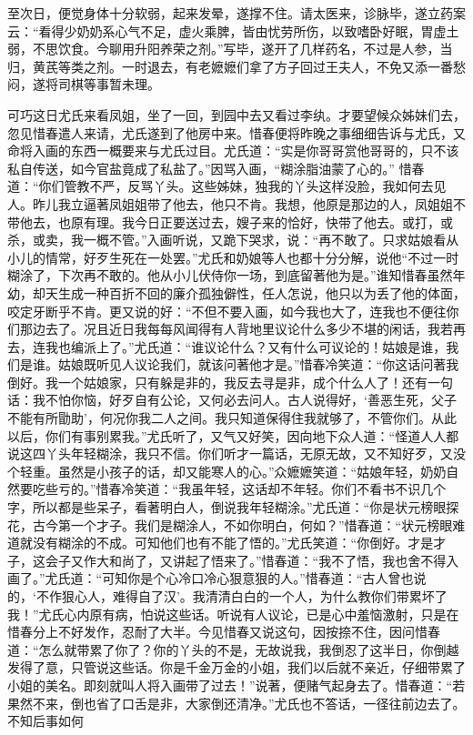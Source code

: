 \begin{parag}


    至次日，便觉身体十分软弱，起来发晕，遂撑不住。请太医来，诊脉毕，遂立药案云：“看得少奶奶系心气不足，虚火乘脾，皆由忧劳所伤，以致嗜卧好眠，胃虚土弱，不思饮食。今聊用升阳养荣之剂。”写毕，遂开了几样药名，不过是人参，当归，黄芪等类之剂。一时退去，有老嬷嬷们拿了方子回过王夫人，不免又添一番愁闷，遂将司棋等事暂未理。
\end{parag}


\begin{parag}


    可巧这日尤氏来看凤姐，坐了一回，到园中去又看过李纨。才要望候众姊妹们去，忽见惜春遣人来请，尤氏遂到了他房中来。惜春便将昨晚之事细细告诉与尤氏，又命将入画的东西一概要来与尤氏过目。尤氏道：“实是你哥哥赏他哥哥的，只不该私自传送，如今官盐竟成了私盐了。”因骂入画，“糊涂脂油蒙了心的。” 惜春道：“你们管教不严，反骂丫头。这些姊妹，独我的丫头这样没脸，我如何去见人。昨儿我立逼著凤姐姐带了他去，他只不肯。我想，他原是那边的人，凤姐姐不带他去，也原有理。我今日正要送过去，嫂子来的恰好，快带了他去。或打，或杀，或卖，我一概不管。”入画听说，又跪下哭求，说：“再不敢了。只求姑娘看从小儿的情常，好歹生死在一处罢。”尤氏和奶娘等人也都十分分解，说他“不过一时糊涂了，下次再不敢的。他从小儿伏侍你一场，到底留著他为是。”谁知惜春虽然年幼，却天生成一种百折不回的廉介孤独僻性，任人怎说，他只以为丢了他的体面，咬定牙断乎不肯。更又说的好：“不但不要入画，如今我也大了，连我也不便往你们那边去了。况且近日我每每风闻得有人背地里议论什么多少不堪的闲话，我若再去，连我也编派上了。”尤氏道：“谁议论什么？又有什么可议论的！姑娘是谁，我们是谁。姑娘既听见人议论我们，就该问著他才是。”惜春冷笑道：“你这话问著我倒好。我一个姑娘家，只有躲是非的，我反去寻是非，成个什么人了！还有一句话：我不怕你恼，好歹自有公论，又何必去问人。古人说得好，‘善恶生死，父子不能有所勖助’，何况你我二人之间。我只知道保得住我就够了，不管你们。从此以后，你们有事别累我。”尤氏听了，又气又好笑，因向地下众人道：“怪道人人都说这四丫头年轻糊涂，我只不信。你们听才一篇话，无原无故，又不知好歹，又没个轻重。虽然是小孩子的话，却又能寒人的心。”众嬷嬷笑道：“姑娘年轻，奶奶自然要吃些亏的。”惜春冷笑道：“我虽年轻，这话却不年轻。你们不看书不识几个字，所以都是些呆子，看著明白人，倒说我年轻糊涂。”尤氏道：“你是状元榜眼探花，古今第一个才子。我们是糊涂人，不如你明白，何如？”惜春道：“状元榜眼难道就没有糊涂的不成。可知他们也有不能了悟的。”尤氏笑道：“你倒好。才是才子，这会子又作大和尚了，又讲起了悟来了。”惜春道：“我不了悟，我也舍不得入画了。”尤氏道：“可知你是个心冷口冷心狠意狠的人。”惜春道：“古人曾也说的，‘不作狠心人，难得自了汉’。我清清白白的一个人，为什么教你们带累坏了我！”尤氏心内原有病，怕说这些话。听说有人议论，已是心中羞恼激射，只是在惜春分上不好发作，忍耐了大半。今见惜春又说这句，因按捺不住，因问惜春道：“怎么就带累了你了？你的丫头的不是，无故说我，我倒忍了这半日，你倒越发得了意，只管说这些话。你是千金万金的小姐，我们以后就不亲近，仔细带累了小姐的美名。即刻就叫人将入画带了过去！”说著，便赌气起身去了。惜春道：“若果然不来，倒也省了口舌是非，大家倒还清净。”尤氏也不答话，一径往前边去了。不知后事如何
\end{parag}

